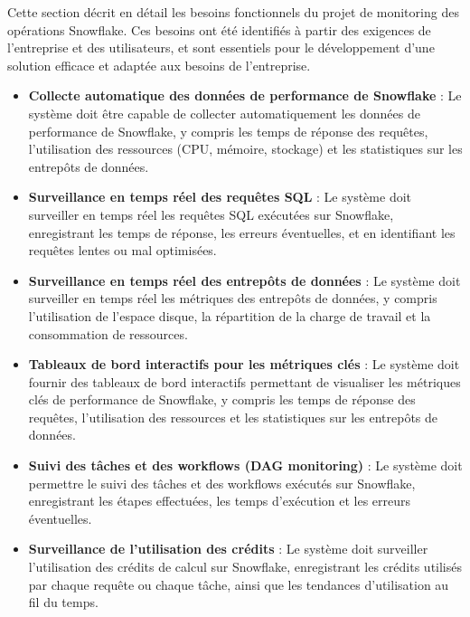         \par Cette section décrit en détail les besoins fonctionnels du projet de monitoring des opérations Snowflake.
        Ces besoins ont été identifiés à partir des exigences de l'entreprise et des utilisateurs, et sont essentiels pour le développement d'une solution efficace et adaptée aux besoins de l'entreprise.
    \begin{itemize}
            \item \textbf{Collecte automatique des données de performance de Snowflake} :
            Le système doit être capable de collecter automatiquement les données de performance de Snowflake, y compris les temps de réponse des requêtes, l'utilisation des ressources (CPU, mémoire, stockage) et les statistiques sur les entrepôts de données.
            
            \item \textbf{Surveillance en temps réel des requêtes SQL} :
            Le système doit surveiller en temps réel les requêtes SQL exécutées sur Snowflake, enregistrant les temps de réponse, les erreurs éventuelles, et en identifiant les requêtes lentes ou mal optimisées.
            
            \item \textbf{Surveillance en temps réel des entrepôts de données} :
            Le système doit surveiller en temps réel les métriques des entrepôts de données, y compris l'utilisation de l'espace disque, la répartition de la charge de travail et la consommation de ressources.
            
            \item \textbf{Tableaux de bord interactifs pour les métriques clés} :
            Le système doit fournir des tableaux de bord interactifs permettant de visualiser les métriques clés de performance de Snowflake, y compris les temps de réponse des requêtes, l'utilisation des ressources et les statistiques sur les entrepôts de données.
            
            \item \textbf{Suivi des tâches et des workflows (DAG monitoring)} :
            Le système doit permettre le suivi des tâches et des workflows exécutés sur Snowflake, enregistrant les étapes effectuées, les temps d'exécution et les erreurs éventuelles.
            
            \item \textbf{Surveillance de l'utilisation des crédits} :
            Le système doit surveiller l'utilisation des crédits de calcul sur Snowflake, enregistrant les crédits utilisés par chaque requête ou chaque tâche, ainsi que les tendances d'utilisation au fil du temps.
            

\end{itemize}
